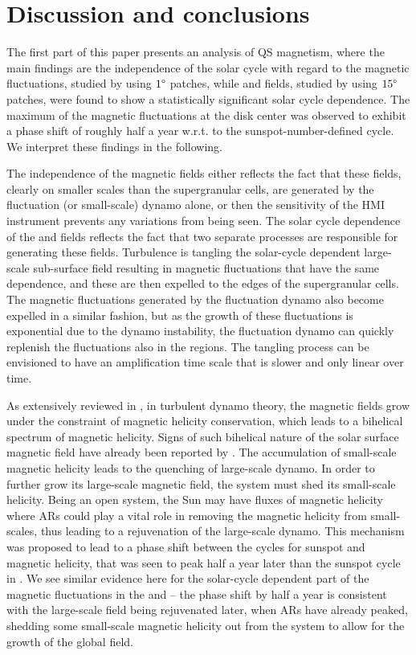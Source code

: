 \documentclass{aa}
\begin{document}
\section{Discussion and conclusions}

The first part of this paper presents an analysis of QS magnetism, where the main findings are the independence of the solar cycle  with regard to the \IN{} magnetic fluctuations, studied by using $1\degree$ patches, while \NW{} and \IN{} fields, studied by using $15 \degree$ patches, were found to show a statistically significant solar cycle dependence. The maximum of the magnetic fluctuations at the disk center was observed to exhibit a phase shift of roughly half a year w.r.t. to the sunspot-number-defined cycle. We interpret these findings in the following. 

The independence of the \IN{} magnetic fields either reflects the fact that these fields, clearly on smaller scales than the supergranular cells, are generated by the fluctuation (or small-scale) dynamo alone, or then the sensitivity of the HMI instrument prevents  any variations from %
being
seen. The solar cycle dependence of the \NW{} and \IN{} fields reflects the fact that two separate processes are responsible for generating these fields. Turbulence is tangling the solar-cycle dependent large-scale sub-surface field resulting in magnetic fluctuations that have the same dependence, and these are then expelled to the edges of the supergranular cells. The magnetic fluctuations generated by the fluctuation dynamo also become expelled in a similar fashion, but as the growth of these fluctuations is exponential due to the dynamo instability, the fluctuation dynamo can quickly replenish the fluctuations also in the \IN{} regions. The tangling process can be envisioned to have an amplification time scale that is slower and only linear over time.

As extensively reviewed in \cite{BS05}, in turbulent dynamo theory, the magnetic fields grow under the constraint of magnetic helicity
conservation, which leads to a bihelical spectrum of magnetic helicity. Signs of such bihelical nature of the solar surface magnetic field have already been reported by \citet{B+17,S+18}. The accumulation of small-scale
magnetic helicity leads to the quenching of large-scale dynamo. In order to further grow its large-scale
magnetic field, the system must shed its small-scale helicity. Being an open system, the Sun
may have fluxes of magnetic helicity where ARs could play a vital role in removing the magnetic
helicity from small-scales, thus leading to a rejuvenation of
the
large-scale dynamo. This mechanism was proposed to lead to a phase shift 
between the cycles for sunspot and magnetic helicity,
that was seen to peak half a year later than the sunspot cycle in \cite{S+18}. We see similar evidence here for the solar-cycle dependent part of the magnetic fluctuations in the \NW{} and \IN{} -- the phase shift by half a year is consistent with the large-scale field being rejuvenated later, when ARs have already peaked, shedding some small-scale magnetic helicity out from the system to allow for the growth of the global field.
\end{document}
